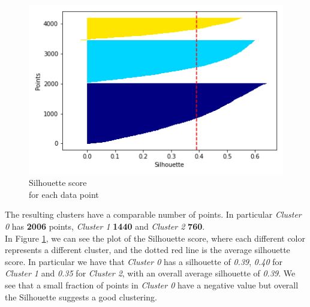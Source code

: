 \begin{figure}
    \vspace{-5mm}
    \centering
    \captionsetup{justification=centering}
    \includegraphics[width=.4\textwidth]{img/clustering/sil_tot.png}
    \caption{Silhouette score\\ for each data point}
    \label{fig:silhouette}
\end{figure}

The resulting clusters have a comparable number of points. In particular \emph{Cluster 0} has \textbf{2006} points, \emph{Cluster 1} \textbf{1440} and \emph{Cluster 2} \textbf{760}.\\
In Figure \ref{fig:silhouette}, we can see the plot of the Silhouette score, where each different color represents a different cluster, and the dotted red line is the average silhouette score. In particular we have that \emph{Cluster 0} has a silhouette of \emph{0.39}, \emph{0.40} for \emph{Cluster 1} and \emph{0.35} for \emph{Cluster 2}, with an overall average silhouette of \emph{0.39}. We see that a small fraction of points in \emph{Cluster 0} have a negative value but overall the Silhouette suggests a good clustering.


